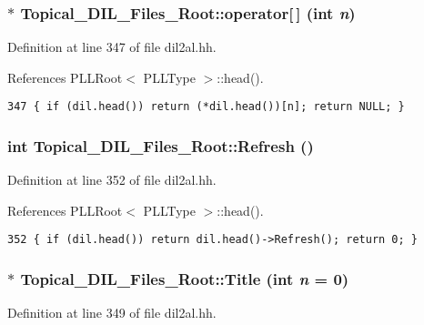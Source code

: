 \subsubsection{$\ast$ Topical\_\-DIL\_\-Files\_\-Root::operator[$\,$] (int {\em n})\hspace{0.3cm}{\tt  [inline]}}\label{classTopical__DIL__Files__Root_a1}




Definition at line 347 of file dil2al.hh.

References PLLRoot$<$ PLLType $>$::head().



\footnotesize\begin{verbatim}347 { if (dil.head()) return (*dil.head())[n]; return NULL; }
\end{verbatim}\normalsize 
{}
\subsubsection{\setlength{\rightskip}{0pt plus 5cm}int Topical\_\-DIL\_\-Files\_\-Root::Refresh ()\hspace{0.3cm}{\tt  [inline]}}\label{classTopical__DIL__Files__Root_a6}




Definition at line 352 of file dil2al.hh.

References PLLRoot$<$ PLLType $>$::head().



\footnotesize\begin{verbatim}352 { if (dil.head()) return dil.head()->Refresh(); return 0; }
\end{verbatim}\normalsize 
{}
\subsubsection{$\ast$ Topical\_\-DIL\_\-Files\_\-Root::Title (int {\em n} = 0)\hspace{0.3cm}{\tt  [inline]}}\label{classTopical__DIL__Files__Root_a3}




Definition at line 349 of file dil2al.hh.

